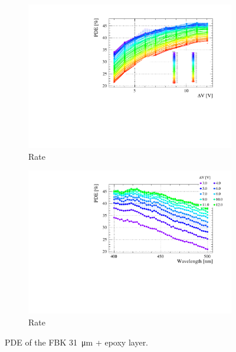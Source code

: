 \begin{landscape}
\begin{figure}[htbp]
\begin{subfigure}{0.65\textwidth}
        \includegraphics[width=\linewidth]{gfx/plots/PDE/31epoxy/c_Freq_Bias.pdf}    
        \caption{Rate}
    \end{subfigure}
    \begin{subfigure}{0.65\textwidth}
        \includegraphics[width=\linewidth]{gfx/plots/PDE/31epoxy/c_Freq_Wavelength.pdf} 
        \caption{Rate}
    \end{subfigure}
    \caption{PDE of the FBK \SI{31}{\micro m} + epoxy layer.}
    \label{fig:pde 31epoxy}
\end{figure}
\end{landscape}
\restoregeometry

